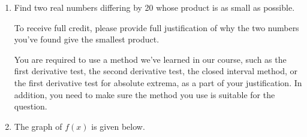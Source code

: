 \documentclass[11pt]{article}
\begin{document}
\begin{enumerate}
\begin{enumerate}

    \item Find the $x$-values of all absolute extrema of $f(x)$ on the interval $[-1, 8]$.


    \vfill
\end{enumerate}


\newpage


\item Find two real numbers differing by 20 whose product is as small as possible.

To receive full credit, please provide full justification of why the two numbers you've found give the smallest product. 

You are required to use a method we've learned in our course, such as the first derivative test, the second derivative test, the closed interval method, or the first derivative test for absolute extrema, as a part of your justification. In addition, you need to make sure the method you use is suitable for the question.


\newpage


\item 

The graph of $f(x)$ is given below.

\begin{center}
    \end{center}


\end{enumerate}
\end{document}
